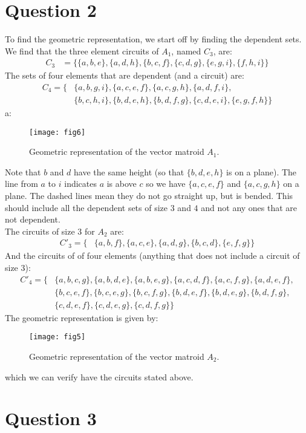 \documentclass[a4paper, fleqn]{article}
\begin{document}
\section*{Question 2}
To find the geometric representation, we start off by finding the dependent sets. We find
that the three element circuits of $A_1$, named $C_3$, are:
\begin{align*}
  C_3&=\{\{a,b,e\},\{a,d,h\},\{b,c,f\},\{c,d,g\},\{e,g,i\},\{f,h,i\}\}
\end{align*}
The sets of four elements that are dependent (and a circuit) are:
\begin{align*}
  C_4=\{&\{a,b,g,i\},\{a,c,e,f\},\{a,c,g,h\},\{a,d,f,i\}, \\
        &\{b,c,h,i\},\{b,d,e,h\},\{b,d,f,g\},\{c,d,e,i\},\{e,g,f,h\}\}
\end{align*}
a:
\begin{figure}[H]
  \centering
  \texttt{[image: fig6]}
  \caption{Geometric representation of the vector matroid $A_1$.}
  \label{fig6}
\end{figure}
Note that $b$ and $d$ have the same height (so that $\{b,d,e,h\}$ is on a plane). The
line from $a$ to $i$ indicates $a$ is above $c$ so we have $\{a,c,e,f\}$ and
$\{a,c,g,h\}$ on a plane. The dashed lines mean they do not go straight up, but is
bended. This should include all the dependent sets of size $3$ and $4$ and not any ones
that are not dependent. \\
The circuits of size $3$ for $A_2$ are:
\begin{align*}
  C'_3=\{&\{a,b,f\},\{a,c,e\},\{a,d,g\},\{b,c,d\},\{e,f,g\}\}
\end{align*}
And the circuits of of four elements (anything that does not include a circuit of size
$3$):
\begin{align*}
  C'_4=\{&\{a,b,c,g\},\{a,b,d,e\},\{a,b,e,g\},\{a,c,d,f\},\{a,c,f,g\},\{a,d,e,f\}, \\
         &\{b,c,e,f\},\{b,c,e,g\},\{b,c,f,g\},\{b,d,e,f\},\{b,d,e,g\},\{b,d,f,g\}, \\
         &\{c,d,e,f\},\{c,d,e,g\},\{c,d,f,g\}\}
\end{align*}
The geometric representation is given by:
\begin{figure}[H]
  \centering
  \texttt{[image: fig5]}
  \caption{Geometric representation of the vector matroid $A_2$.}
  \label{fig5}
\end{figure}
which we can verify have the circuits stated above.

\section*{Question 3}
\end{document}
